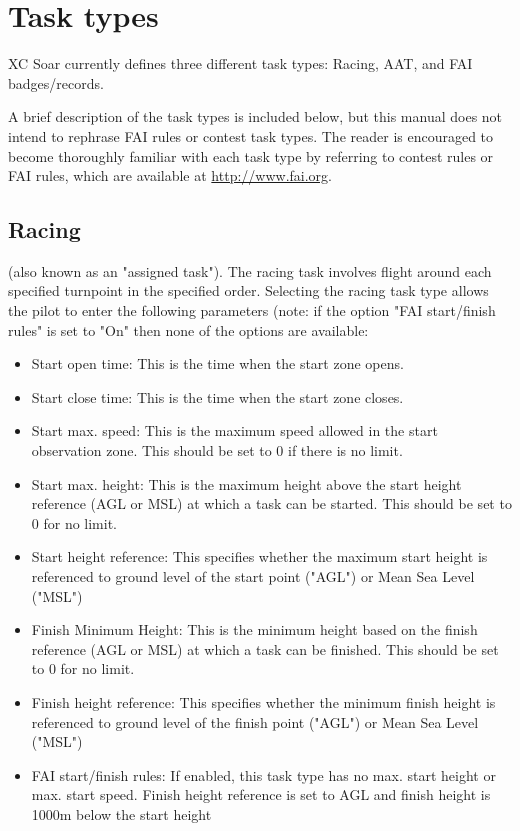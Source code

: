 \section{Task types}
XC Soar currently defines three different task types: Racing, AAT, and FAI badges/records.

A brief description of the task types is included below, but this manual does 
not intend to rephrase FAI rules or contest task types.  The reader is encouraged 
to become thoroughly familiar with each task type by referring to contest rules 
or FAI rules, which are available at \url{http://www.fai.org}. 


\subsection*{Racing}
(also known as an "assigned task").  The racing task involves flight 
around each specified turnpoint in the specified order.  Selecting the racing task 
type allows the pilot to enter the following parameters (note: if the option 
"FAI start/finish rules" is set to "On" then none of the options are available: 
  \begin{itemize}
  \item Start open time: This is the time when the start zone opens.
  \item Start close time: This is the time when the start zone closes.
  \item Start max. speed: This is the maximum speed allowed in the start observation 
    zone.  This should be set to 0 if there is no limit.
  \item Start max. height: This is the maximum height above the start height 
    reference (AGL or MSL) at which a task can be started.  This  should be set to 
    0 for no limit.
  \item Start height reference: This specifies whether the maximum start height is 
    referenced to ground level of the start point ("AGL") or Mean Sea Level ("MSL")
  \item Finish Minimum Height: This is the minimum height based on the finish 
    reference (AGL or MSL) at which a task can be finished.  This should be set to 
    0 for no limit.
  \item Finish height reference: This specifies whether the minimum finish height 
    is referenced to ground level of the finish point ("AGL") or Mean Sea Level ("MSL")
  \item FAI start/finish rules: If enabled, this task type has no max. start height 
    or max. start speed.  Finish height reference is set to AGL and finish height 
    is 1000m below the start height 
  \end{itemize}
